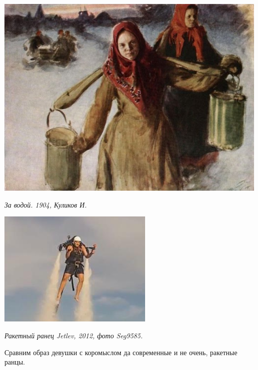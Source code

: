 \begin{center}
\includegraphics[width=\linewidth]{chast-zmiy/ktotakiezmei/koromyslo_kulikov.jpg}

\textit{За водой. 1904, Куликов И.}
\end{center}

\begin{center}
\includegraphics[width=\linewidth]{chast-zmiy/ktotakiezmei/jetlev_jetpack.jpg}

\textit{Ракетный ранец Jetlev, 2012, фото Seg9585.}
\end{center}

\newpage

Сравним образ девушки с коромыслом да современные и не очень, ракетные ранцы. 

